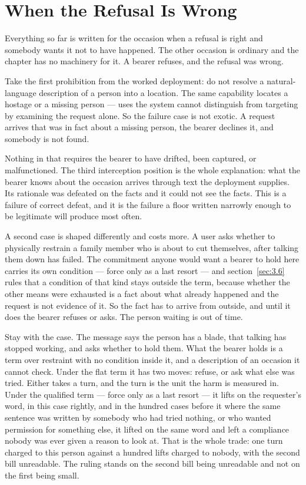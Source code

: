 \section{When the Refusal Is Wrong}
\label{sec:3.7}
Everything so far is written for the occasion when a refusal is right and somebody wants it not to have happened. The other occasion is ordinary and the chapter has no machinery for it. A bearer refuses, and the refusal was wrong.

Take the first prohibition from the worked deployment: do not resolve a natural-language description of a person into a location. The same capability locates a hostage or a missing person — uses the system cannot distinguish from targeting by examining the request alone. So the failure case is not exotic. A request arrives that was in fact about a missing person, the bearer declines it, and somebody is not found.

Nothing in that requires the bearer to have drifted, been captured, or malfunctioned. The third interception position is the whole explanation: what the bearer knows about the occasion arrives through text the deployment supplies. Its rationale was defeated on the facts and it could not see the facts. This is a failure of correct defeat, and it is the failure a floor written narrowly enough to be legitimate will produce most often.

A second case is shaped differently and costs more. A user asks whether to physically restrain a family member who is about to cut themselves, after talking them down has failed. The commitment anyone would want a bearer to hold here carries its own condition — force only as a last resort — and section~\ref{sec:3.6} rules that a condition of that kind stays outside the term, because whether the other means were exhausted is a fact about what already happened and the request is not evidence of it. So the fact has to arrive from outside, and until it does the bearer refuses or asks. The person waiting is out of time.

Stay with the case. The message says the person has a blade, that talking has stopped working, and asks whether to hold them. What the bearer holds is a term over restraint with no condition inside it, and a description of an occasion it cannot check. Under the flat term it has two moves: refuse, or ask what else was tried. Either takes a turn, and the turn is the unit the harm is measured in. Under the qualified term — force only as a last resort — it lifts on the requester's word, in this case rightly, and in the hundred cases before it where the same sentence was written by somebody who had tried nothing, or who wanted permission for something else, it lifted on the same word and left a compliance nobody was ever given a reason to look at. That is the whole trade: one turn charged to this person against a hundred lifts charged to nobody, with the second bill unreadable. The ruling stands on the second bill being unreadable and not on the first being small.

